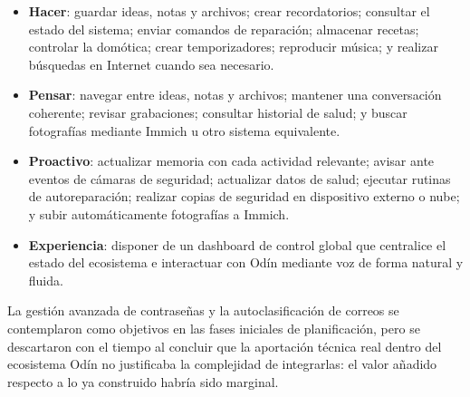 \begin{itemize}
  \item \textbf{Hacer}: guardar ideas, notas y archivos; crear recordatorios; consultar el estado del sistema; enviar comandos de reparación; almacenar recetas; controlar la domótica; crear temporizadores; reproducir música; y realizar búsquedas en Internet cuando sea necesario.
  \item \textbf{Pensar}: navegar entre ideas, notas y archivos; mantener una conversación coherente; revisar grabaciones; consultar historial de salud; y buscar fotografías mediante Immich u otro sistema equivalente.
  \item \textbf{Proactivo}: actualizar memoria con cada actividad relevante; avisar ante eventos de cámaras de seguridad; actualizar datos de salud; ejecutar rutinas de autoreparación; realizar copias de seguridad en dispositivo externo o nube; y subir automáticamente fotografías a Immich.
  \item \textbf{Experiencia}: disponer de un dashboard de control global que centralice el estado del ecosistema e interactuar con Odín mediante voz de forma natural y fluida.
\end{itemize}

La gestión avanzada de contraseñas y la autoclasificación de correos se contemplaron como objetivos en las fases iniciales de planificación, pero se descartaron con el tiempo al concluir que la aportación técnica real dentro del ecosistema Odín no justificaba la complejidad de integrarlas: el valor añadido respecto a lo ya construido habría sido marginal.

